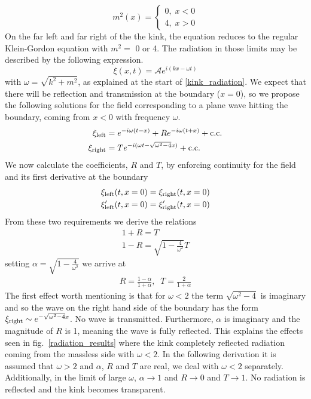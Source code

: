\documentclass[11pt, oneside]{article}  	%
\numberwithin{equation}{section}
\begin{document}
\begin{equation}
m^2 (x) =\left\{\begin{matrix}
0, \; x<0\\ 
4, \; x>0
\end{matrix}\right.
\end{equation}
On the far left and far right of the the kink, the equation reduces to the regular Klein-Gordon equation with $m^2 = $ 0 or 4. The radiation in those limits may be described by the following expression.
\begin{equation}
\xi(x,t) = \mathcal{A}e^{i(kx-\omega t)}
\end{equation}
with $\omega = \sqrt{k^2 + m^2}$, as explained at the start of \textsection \ref{kink_radiation}. We expect that there will be reflection and transmission at the boundary ($x=0$), so we propose the following solutions for the field corresponding to a plane wave hitting the boundary, coming from $x<0$ with frequency $\omega$.
\begin{align}
\xi_\textup{left} &= e^{-i\omega (t-x)} + Re^{-i\omega (t+x)} + \textup{c.c.} \label{wave_left}\\
\xi_\textup{right} &= T e^{-i(\omega t-\sqrt{\omega^2 - 4}x)} + \textup{c.c.} \label{wave_right}
\end{align}
We now calculate the coefficients, $R$ and $T$, by enforcing continuity for the field and its first derivative at the boundary
\begin{align}
\xi_\textup{left}(t,x=0) &= \xi_\textup{right}(t,x=0) \label{cont1}\\
\xi'_\textup{left}(t,x=0) &= \xi'_\textup{right}(t,x=0)\label{cont2}
\end{align}
From these two requirements we derive the relations
\begin{align}
1+R = T\\
1-R = \sqrt{1-\frac{4}{\omega^2}}T
\end{align}
setting $\alpha = \sqrt{1-\frac{4}{\omega^2}}$ we arrive at
\begin{align} \label{RT}
R = \frac{1-\alpha}{1+\alpha}, \;\; T = \frac{2}{1+\alpha}
\end{align}
The first effect worth mentioning is that for $\omega < 2$ the term $\sqrt{\omega^2 - 4}$ is imaginary and so the wave on the right hand side of the boundary has the form $ \xi_\textup{right} \sim e^{-\sqrt{\omega^2 - 4}x}$. No wave is transmitted. Furthermore, $\alpha$ is imaginary and the magnitude of $R$ is 1, meaning the wave is fully reflected. This explains the effects seen in fig.~\ref{radiation_results} where the kink completely reflected radiation coming from the massless side with $\omega < 2$. In the following derivation it is assumed that $\omega> 2$ and $\alpha$, $R$ and $T$ are real, we deal with $\omega< 2$ separately. Additionally, in the limit of large $\omega$, $\alpha \rightarrow 1$ and $R\rightarrow0$ and $T \rightarrow 1$. No radiation is reflected and the kink becomes transparent.\par
\end{document}

